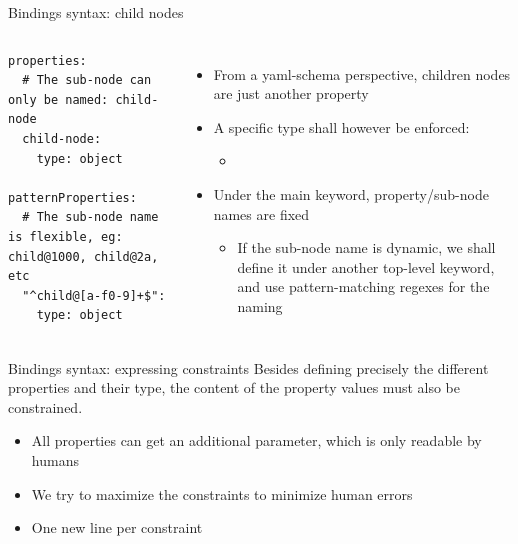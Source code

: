 \begin{frame}[fragile]{Bindings syntax: child nodes}
  \begin{columns}
    \begin{block}{}
      {\fontsize{5}{6}\selectfont
\begin{verbatim}
properties:
  # The sub-node can only be named: child-node
  child-node:
    type: object

patternProperties:
  # The sub-node name is flexible, eg: child@1000, child@2a, etc
  "^child@[a-f0-9]+$":
    type: object
\end{verbatim}
      }
    \end{block}
    \begin{itemize}
    \item From a yaml-schema perspective, children nodes are just another
      property
    \item A specific type shall however be enforced:
      \begin{itemize}
      \item {}
      \end{itemize}
    \item Under the main  keyword, property/sub-node
      names are fixed
      \begin{itemize}
      \item If the sub-node name is dynamic, we shall define it under
        another top-level keyword,  and use
        pattern-matching regexes for the naming
      \end{itemize}
    \end{itemize}
  \end{columns}
\end{frame}

\begin{frame}{Bindings syntax: expressing constraints}
  Besides defining precisely the different properties and their type,
  the content of the property values must also be constrained.
  \begin{itemize}
  \item All properties can get an additional 
    parameter, which is only readable by humans
  \item We try to maximize the constraints to minimize human errors
  \item One new line per constraint
  \end{itemize}
\end{frame}

